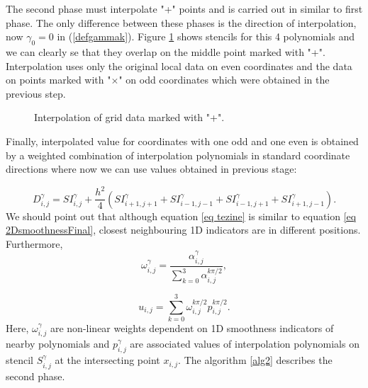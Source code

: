 	 	

The second phase must interpolate "+" points and is carried out in similar to first phase. The only difference between these phases is the direction of interpolation, now $\gamma_0=0$ in (\ref{defgammak}). Figure \ref{fig:+} shows stencils for this 4 polynomials and we can clearly se that they overlap on the middle point marked with "+". Interpolation uses only the original local data on even coordinates and the data on points marked with "$\times$" on odd coordinates which were obtained in the previous step.
	
\begin{figure}
		\begin{center}
			{
				 }			
			\caption{Interpolation of grid data marked with "+".}
			\label{fig:+}
		\end{center}
\end{figure}
	

	
	Finally, interpolated value for coordinates with one odd and one even is obtained by a weighted combination of interpolation polynomials in standard coordinate directions where now we can use values obtained in previous stage:
	
	\begin{equation}\label{eq tezine}
				D_{i,j}^\gamma= SI_{i,j}^\gamma+ \frac{h^2}{4}(SI_{i+1,j+1}^\gamma+SI_{i-1,j-1}^\gamma+SI_{i-1,j+1}^\gamma+SI_{i+1,j-1}^\gamma) .
	\end{equation}
	We should point out that although equation \eqref{eq tezine} is similar to equation \eqref{eq 2DsmoothnessFinal}, closest neighbouring 1D indicators are in different positions. 
	Furthermore,
	\begin{equation}\label{eq IzrazOmega2dRavno}				
		\omega_{i,j}^\gamma=\frac{\alpha_{i,j}^\gamma}{\sum_{k=0}^3\alpha_{i,j}^{k\pi/2}},
	\end{equation}
	
	\begin{equation}\label{eq 2dKombinacijaRavno}
		u_{i,j}=\sum_{k=0}^3 \omega_{i,j}^{k\pi/2} p_{i,j}^{k\pi/2}.
	\end{equation}
		Here, $\omega_{i,j}^\gamma$ are non-linear weights dependent on 1D smoothness indicators of nearby polynomials %
and $p_{i,j}^\gamma$ are associated values of interpolation polynomials on stencil $S_{i,j}^{\gamma}$ at the intersecting point $x_{i,j}$.
		The algorithm \ref{alg2} describes the second phase.

